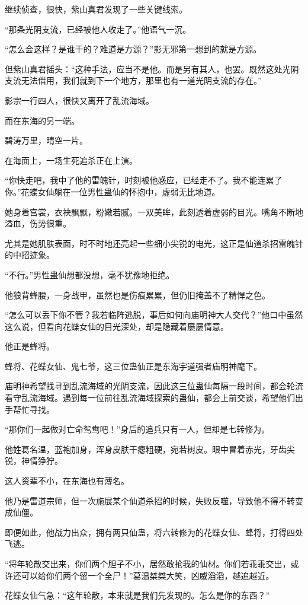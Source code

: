 \begin{this_body}
继续侦查，很快，紫山真君发现了一些关键线索。

“那条光阴支流，已经被他人收走了。”他语气一沉。

“怎么会这样？是谁干的？难道是方源？”影无邪第一想到的就是方源。

但紫山真君摇头：“这种手法，应当不是他。而是另有其人，也罢。既然这处光阴支流无法借用，我们就到下一个地方，那里也有一道光阴支流的存在。”

影宗一行四人，很快又离开了乱流海域。

而在东海的另一端。

碧涛万里，晴空一片。

在海面上，一场生死追杀正在上演。

“你快走吧，我中了他的雷魄针，时刻被他感应，已经走不了。我不能连累了你。”花蝶女仙躺在一位男性蛊仙的怀抱中，虚弱无比地道。

她身着宫裳，衣袂飘飘，粉嫩若腻。一双美眸，此刻透着虚弱的目光。嘴角不断地溢血，伤势很重。

尤其是她肌肤表面，时不时地还亮起一些细小尖锐的电光，这正是仙道杀招雷魄针的中招迹象。

“不行。”男性蛊仙想都没想，毫不犹豫地拒绝。

他狼背蜂腰，一身战甲，虽然也是伤痕累累，但仍旧掩盖不了精悍之色。

“怎么可以丢下你不管？我若临阵逃脱，事后如何向庙明神大人交代？”他口中虽然这么说，但看向花蝶女仙的目光深处，却是隐藏着屡屡情意。

他正是蜂将。

蜂将、花蝶女仙、鬼七爷，这三位蛊仙正是东海宇道强者庙明神麾下。

庙明神希望找寻到乱流海域的光阴支流，因此这三位蛊仙每隔一段时间，都会轮流看守乱流海域。遇到每一位前往乱流海域探索的蛊仙，都会上前交谈，希望他们出手帮忙寻找。

“那你们一起做对亡命鸳鸯吧！”身后的追兵只有一人，但却是七转修为。

他姓葛名温，蓝袍加身，浑身皮肤干瘪粗硬，宛若树皮。眼中冒着赤光，牙齿尖锐，神情狰狞。

这人资辈不小，在东海也有薄名。

他乃是雷道宗师，但一次施展某个仙道杀招的时候，失败反噬，导致他不得不转变成仙僵。

即便如此，他战力出众，拥有两只仙蛊，将六转修为的花蝶女仙、蜂将，打得四处飞逃。

“将年轮散交出来，你们两个胆子不小，居然敢抢我的仙材。你们若乖乖交出，或许还可以给你们两个留一个全尸！”葛温桀桀大笑，凶威滔滔，越追越近。

花蝶女仙气急：“这年轮散，本来就是我们先发现的。怎么是你的东西？”


\end{this_body}
